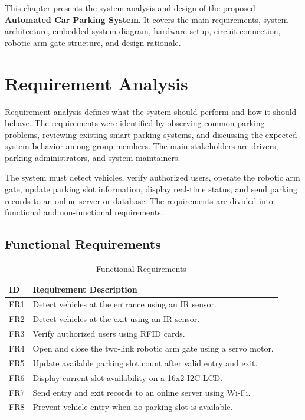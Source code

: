 
\vspace{-0.8cm}

This chapter presents the system analysis and design of the proposed \textbf{Automated Car Parking System}. It covers the main requirements, system architecture, embedded system diagram, hardware setup, circuit connection, robotic arm gate structure, and design rationale.

\section{Requirement Analysis}

Requirement analysis defines what the system should perform and how it should behave. The requirements were identified by observing common parking problems, reviewing existing smart parking systems, and discussing the expected system behavior among group members. The main stakeholders are drivers, parking administrators, and system maintainers.

The system must detect vehicles, verify authorized users, operate the robotic arm gate, update parking slot information, display real-time status, and send parking records to an online server or database. The requirements are divided into functional and non-functional requirements.

\subsection{Functional Requirements}

\begin{table}[H]
\centering
\small
\caption{Functional Requirements}
\label{tab:functional_requirements}
\begin{tabular}{p{2.2cm} p{11cm}}
\toprule
\textbf{ID} & \textbf{Requirement Description} \\
\midrule
FR1 & Detect vehicles at the entrance using an IR sensor. \\
FR2 & Detect vehicles at the exit using an IR sensor. \\
FR3 & Verify authorized users using RFID cards. \\
FR4 & Open and close the two-link robotic arm gate using a servo motor. \\
FR5 & Update available parking slot count after valid entry and exit. \\
FR6 & Display current slot availability on a 16x2 I2C LCD. \\
FR7 & Send entry and exit records to an online server using Wi-Fi. \\
FR8 & Prevent vehicle entry when no parking slot is available. \\
\bottomrule
\end{tabular}
\normalsize
\end{table}

